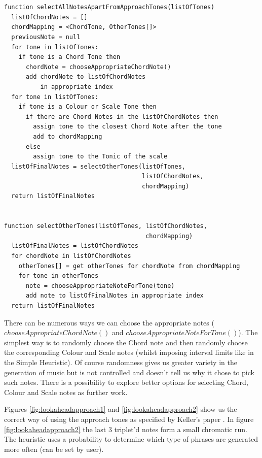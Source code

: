 \documentclass[pdftex,12pt,a4paper]{report}
\begin{document}
\begin{verbatim}


function selectAllNotesApartFromApproachTones(listOfTones)
  listOfChordNotes = []
  chordMapping = <ChordTone, OtherTones[]>
  previousNote = null
  for tone in listOfTones:
    if tone is a Chord Tone then
      chordNote = chooseAppropriateChordNote()
      add chordNote to listOfChordNotes 
          in appropriate index
  for tone in listOfTones:
    if tone is a Colour or Scale Tone then
      if there are Chord Notes in the listOfChordNotes then
        assign tone to the closest Chord Note after the tone
        add to chordMapping
      else
        assign tone to the Tonic of the scale
  listOfFinalNotes = selectOtherTones(listOfTones, 
                                      listOfChordNotes, 
                                      chordMapping)
  return listOfFinalNotes


function selectOtherTones(listOfTones, listOfChordNotes, 
                                       chordMapping)
  listOfFinalNotes = listOfChordNotes
  for chordNote in listOfChordNotes
    otherTones[] = get otherTones for chordNote from chordMapping
    for tone in otherTones
      note = chooseAppropriateNoteForTone(tone)
      add note to listOfFinalNotes in appropriate index
  return listOfFinalNotes

\end{verbatim}

There can be numerous ways we can choose the appropriate notes ($chooseAppropriateChordNote()$ and $chooseAppropriateNoteForTone()$). The simplest way is to randomly choose the Chord note and then randomly choose the corresponding Colour and Scale notes (whilst imposing interval limits like in the Simple Heuristic). Of course randomness gives us greater variety in the generation of music but is not controlled and doesn't tell us why it chose to pick such notes. There is a possibility to explore better options for selecting Chord, Colour and Scale notes as further work. 

Figures \ref{fig:lookaheadapproach1} and \ref{fig:lookaheadapproach2} show us the correct way of using the approach tones as specified by Keller's paper \cite{keller07}. In figure \ref{fig:lookaheadapproach2} the last 3 triplet'd notes form a small chromatic run. The heuristic uses a probability to determine which type of phrases are generated more often (can be set by user).

\end{document}
